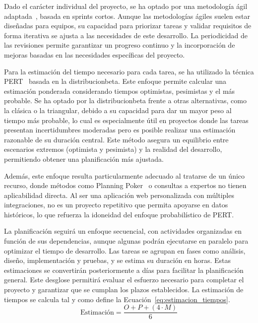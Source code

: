 Dado el carácter individual del proyecto, se ha optado por una metodología ágil adaptada~\cite{ilieva2004analyses}, basada en \glspl{sprint} cortos. Aunque las metodologías ágiles suelen estar diseñadas para equipos, su capacidad para priorizar tareas y validar requisitos de forma iterativa se ajusta a las necesidades de este desarrollo. La periodicidad de las revisiones permite garantizar un progreso continuo y la incorporación de mejoras basadas en las necesidades específicas del proyecto.

Para la estimación del tiempo necesario para cada tarea, se ha utilizado la técnica \gls{PERT}~\cite{mazlum2015cpm} basada en la \gls{distribucionbeta}. Este enfoque permite calcular una estimación ponderada considerando tiempos optimistas, pesimistas y el más probable. Se ha optado por la \gls{distribucionbeta} frente a otras alternativas, como la clásica o la triangular, debido a su capacidad para dar un mayor peso al tiempo más probable, lo cual es especialmente útil en proyectos donde las tareas presentan incertidumbres moderadas pero es posible realizar una estimación razonable de su duración central. Este método asegura un equilibrio entre escenarios extremos (optimista y pesimista) y la realidad del desarrollo, permitiendo obtener una planificación más ajustada.

Además, este enfoque resulta particularmente adecuado al tratarse de un único recurso, donde métodos como Planning Poker~\cite{planningpoker} o consultas a expertos no tienen aplicabilidad directa. Al ser una aplicación web personalizada con múltiples integraciones, no es un proyecto repetitivo que permita apoyarse en datos históricos, lo que refuerza la idoneidad del enfoque probabilístico de \gls{PERT}.

La planificación seguirá un enfoque secuencial, con actividades organizadas en función de sus dependencias, aunque algunas podrán ejecutarse en paralelo para optimizar el tiempo de desarrollo. Las tareas se agrupan en fases como análisis, diseño, implementación y pruebas, y se estima su duración en horas. Estas estimaciones se convertirán posteriormente a días para facilitar la planificación general.
Este desglose permitirá evaluar el esfuerzo necesario para completar el proyecto y garantizar que se cumplan los plazos establecidos.
La estimación de tiempos se calcula tal y como define la Ecuación~\ref{eq:estimacion_tiempos}.
\begin{equation}
    \text{Estimación} = \frac{O + P + (4 \cdot M)}{6}
    \label{eq:estimacion_tiempos}
\end{equation}


